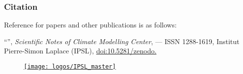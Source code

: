 \subsubsection*{Citation}

Reference for papers and other publications is as follows:

\medskip

\begin{sloppypar}
  ``{\bfseries \heading}\ifdef{\subheading}{ -- \subheading}{}'',
  {\em Scientific Notes of Climate Modelling Center}, \textbf{\ipslnum} --- ISSN 1288-1619,
  Institut Pierre-Simon Laplace (IPSL),
  \href{https://doi.org/10.5281/zenodo.\zid}{doi:10.5281/zenodo.\zid}
\end{sloppypar}

\begin{figure}[b]
  \begin{minipage}[c]{0.7\textwidth}
    \small
  \end{minipage}
  \hfill
  \begin{minipage}[c]{0.25\textwidth}
    \href{http://www.cmc.ipsl.fr}{\texttt{[image: logos/IPSL\_master]}}
  \end{minipage}
\end{figure}
